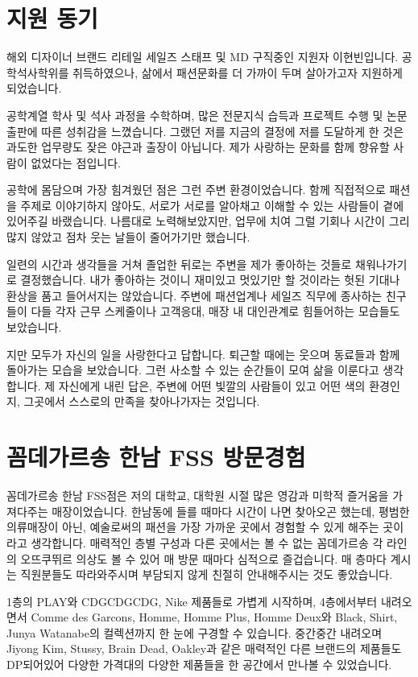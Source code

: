 \section*{지원 동기}
해외 디자이너 브랜드 리테일 세일즈 스태프 및 MD 구직중인 지원자 이현빈입니다. 공학석사학위를 취득하였으나, 삶에서 패션문화를 더 가까이 두며 살아가고자 지원하게 되었습니다.

공학계열 학사 및 석사 과정을 수학하며, 많은 전문지식 습득과 프로젝트 수행 및 논문출판에 따른 성취감을 느꼈습니다. 그랬던 저를 지금의 결정에 저를 도달하게 한 것은 과도한 업무량도 잦은 야근과 출장이 아닙니다. 제가 사랑하는 문화를 함께 향유할 사람이 없었다는 점입니다.

공학에 몸담으며 가장 힘겨웠던 점은 그런 주변 환경이었습니다. 함께 직접적으로 패션을 주제로 이야기하지 않아도, 서로가 서로를 알아채고 이해할 수 있는 사람들이 곁에 있어주길 바랬습니다. 나름대로 노력해보았지만, 업무에 치여 그럴 기회나 시간이 그리 많지 않았고 점차 웃는 날들이 줄어가기만 했습니다.

일련의 시간과 생각들을 거쳐 졸업한 뒤로는 주변을 제가 좋아하는 것들로 채워나가기로 결정했습니다. 내가 좋아하는 것이니 재미있고 멋있기만 할 것이라는 헛된 기대나 환상을 품고 들어서지는 않았습니다. 주변에 패션업계나 세일즈 직무에 종사하는 친구들이 다들 각자 근무 스케줄이나 고객응대, 매장 내 대인관계로 힘들어하는 모습들도 보았습니다.

지만 모두가 자신의 일을 사랑한다고 답합니다. 퇴근할 때에는 웃으며 동료들과 함께 돌아가는 모습을 보았습니다.
그런 사소할 수 있는 순간들이 모여 삶을 이룬다고 생각합니다. 제 자신에게 내린 답은, 주변에 어떤 빛깔의 사람들이 있고 어떤 색의 환경인지, 그곳에서 스스로의 만족을 찾아나가자는 것입니다.

\section*{꼼데가르송 한남 FSS 방문경험}
꼼데가르송 한남 FSS점은 저의 대학교, 대학원 시절 많은 영감과 미학적 즐거움을 가져다주는 매장이었습니다. 한남동에 들를 때마다 시간이 나면 찾아오곤 했는데, 평범한 의류매장이 아닌, 예술로써의 패션을 가장 가까운 곳에서 경험할 수 있게 해주는 곳이라고 생각합니다. 매력적인 층별 구성과 다른 곳에서는 볼 수 없는 꼼데가르송 각 라인의 오뜨쿠뛰르 의상도 볼 수 있어 매 방문 때마다 심적으로 즐겁습니다. 매 층마다 계시는 직원분들도 따라와주시며 부담되지 않게 친절히 안내해주시는 것도 좋았습니다.

1층의 PLAY와 CDGCDGCDG, Nike 제품들로 가볍게 시작하며, 4층에서부터 내려오면서 Comme des Garcons, Homme, Homme Plus, Homme Deux와 Black, Shirt, Junya Watanabe의 컬렉션까지 한 눈에 구경할 수 있습니다. 중간중간 내려오며 Jiyong Kim, Stussy, Brain Dead, Oakley과 같은 매력적인 다른 브랜드의 제품들도 DP되어있어 다양한 가격대의 다양한 제품들을 한 공간에서 만나볼 수 있었습니다.

